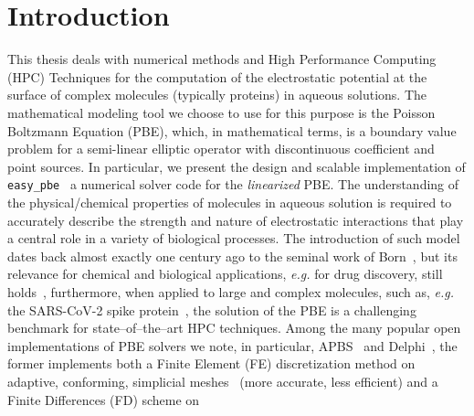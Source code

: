 \documentclass[11pt,a4paper]{article}
\begin{document}



\section{Introduction}
\label{sec:introduction}
This thesis deals with numerical methods and High Performance 
Computing (HPC) 
Techniques for the computation of the electrostatic potential at 
the surface
of complex molecules (typically proteins) in aqueous solutions. 
%
The mathematical modeling tool we choose to use for this purpose is the 
Poisson Boltzmann Equation (PBE), which, in mathematical terms, 
is a boundary value problem for a semi-linear elliptic operator with 
discontinuous coefficient and point sources.  
%
In particular, we present the design and scalable implementation of {\tt 
easy\_pbe}~\cite{easypbe} a numerical solver code for the 
\emph{linearized} PBE.
%
The understanding of the physical/chemical properties of molecules in 
aqueous solution
is required to accurately describe the strength and nature of 
electrostatic interactions that play a central role in a variety of 
biological processes.
%
The introduction of such model dates back almost exactly one century ago 
to the seminal work of Born~\cite{ref2}, but its relevance for chemical
and biological applications, {\it e.g.} for drug discovery, still 
holds~\cite{ref1},
furthermore, when applied to large and complex molecules, such as, {\it 
e.g.} the 
SARS-CoV-2 spike protein~\cite{ref14}, the solution of the PBE is a 
challenging 
benchmark for state--of--the--art HPC techniques.
%
Among the many popular open implementations of PBE solvers we note, 
in particular, APBS~\cite{ref3} and 
Delphi~\cite{ref6,ref7,ref7a,ref7b}, the former implements both a Finite 
Element (FE) 
discretization method on adaptive, conforming, simplicial 
meshes~\cite{ref4,ref5} 
(more accurate, less efficient) and a Finite Differences (FD) scheme on 
\end{document}
